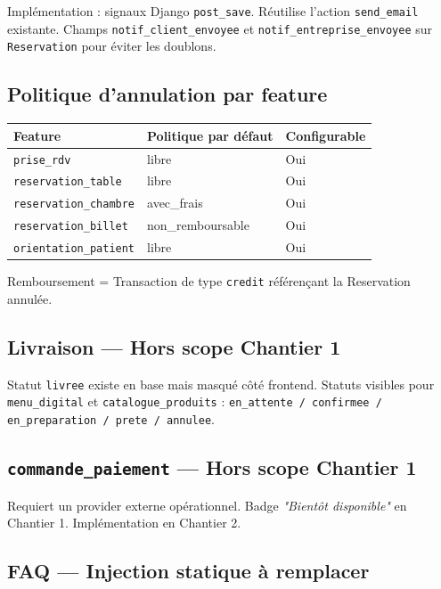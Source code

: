 \documentclass[11pt,a4paper]{article}
\newcommand{\slug}[1]{\texttt{\color{AGTDark}#1}}
\begin{document}
Implémentation : signaux Django \texttt{post\_save}. Réutilise l'action
\slug{send\_email} existante. Champs \slug{notif\_client\_envoyee} et
\slug{notif\_entreprise\_envoyee} sur \slug{Reservation} pour éviter les doublons.

\subsection{Politique d'annulation par feature}

\begin{center}
\begin{tabularx}{\textwidth}{lll}
\toprule
\textbf{Feature} & \textbf{Politique par défaut} & \textbf{Configurable} \\
\midrule
\slug{prise\_rdv} & libre & Oui \\
\slug{reservation\_table} & libre & Oui \\
\slug{reservation\_chambre} & avec\_frais & Oui \\
\slug{reservation\_billet} & non\_remboursable & Oui \\
\slug{orientation\_patient} & libre & Oui \\
\bottomrule
\end{tabularx}
\end{center}

Remboursement = Transaction de type \texttt{credit} référençant la Reservation annulée.

\subsection{Livraison — Hors scope Chantier 1}

Statut \texttt{livree} existe en base mais masqué côté frontend.
Statuts visibles pour \slug{menu\_digital} et \slug{catalogue\_produits} :
\texttt{en\_attente / confirmee / en\_preparation / prete / annulee}.

\subsection{\slug{commande\_paiement} — Hors scope Chantier 1}

Requiert un provider externe opérationnel. Badge \textit{"Bientôt disponible"}
en Chantier 1. Implémentation en Chantier 2.

\subsection{FAQ — Injection statique à remplacer}
\end{document}
